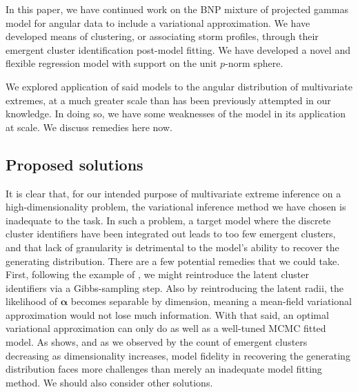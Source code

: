 In this paper, we have continued work on the BNP mixture of projected gammas model for angular data 
    to include a variational approximation.  We have developed means of clustering, or associating 
    storm profiles, through their emergent cluster identification post-model fitting.  We have developed
    a novel and flexible regression model with support on the unit $p$-norm sphere.  

We explored application of said models to the angular distribution of multivariate extremes, at a much 
    greater scale than has been previously attempted in our knowledge.  In doing so, we have some 
    weaknesses of the model in its application at scale.  We discuss remedies here now.

\subsection{Proposed solutions}
It is clear that, for our intended purpose of multivariate extreme inference on a high-dimensionality
    problem, the variational inference method we have chosen is inadequate to the task.  In such a
    problem, a target model where the discrete cluster identifiers have been integrated out leads to too
    few emergent clusters, and that lack of granularity is detrimental to the model's ability to recover
    the generating distribution.  There are a few potential remedies that we could take.  First, following
    the example of \cite{Loaizamaya2022}, we might reintroduce the latent cluster identifiers via a 
    Gibbs-sampling step.  Also by reintroducing the latent radii, the likelihood of $\bm{\alpha}$ becomes
    separable by dimension, meaning a mean-field variational approximation would not lose much information.
    With that said, an optimal variational approximation can only do as well as a well-tuned MCMC fitted
    model.  As \cite{chandra2023} shows, and as we observed by the count of emergent clusters decreasing as 
    dimensionality increases, model fidelity in recovering the generating distribution faces more challenges
    than merely an inadequate model fitting method.  We should also consider other solutions.

